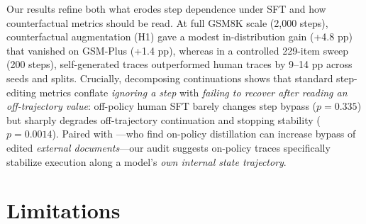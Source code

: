 \documentclass[11pt]{article}
\begin{document}
Our results refine both what erodes step dependence under SFT and how counterfactual metrics should be read.
At full GSM8K scale (2,000 steps), counterfactual augmentation (H1) gave a modest in-distribution gain (+4.8 pp) that vanished on GSM-Plus (+1.4 pp), whereas in a controlled 229-item sweep (200 steps), self-generated traces outperformed human traces by 9--14 pp across seeds and splits.
Crucially, decomposing continuations shows that standard step-editing metrics conflate \emph{ignoring a step} with \emph{failing to recover after reading an off-trajectory value}: off-policy human SFT barely changes step bypass ($p=0.335$) but sharply degrades off-trajectory continuation and stopping stability ($p=0.0014$).
Paired with \citet{xu2026evidencebypass}---who find on-policy distillation can increase bypass of edited \emph{external documents}---our audit suggests on-policy traces specifically stabilize execution along a model's \emph{own internal state trajectory}.

\clearpage
\section*{Limitations}
\label{sec:limitations}
\end{document}
